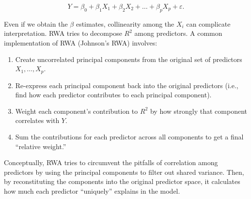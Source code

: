 \begin{equation}
Y = \beta_0 + \beta_1 X_1 + \beta_2 X_2 + \ldots + \beta_p X_p + \varepsilon.
\end{equation}

Even if we obtain the $\beta$ estimates, collinearity among the $X_i$ can complicate interpretation. RWA tries to decompose $R^2$ among predictors. A common implementation of RWA (Johnson's RWA) involves:
\begin{enumerate}
    \item Create uncorrelated principal components from the original set of predictors $X_1, \dots, X_p$.
    \item Re-express each principal component back into the original predictors (i.e., find how each predictor contributes to each principal component).
    \item Weight each component's contribution to $R^2$ by how strongly that component correlates with $Y$.
    \item Sum the contributions for each predictor across all components to get a final ``relative weight.''
\end{enumerate}

Conceptually, RWA tries to circumvent the pitfalls of correlation among predictors by using the principal components to filter out shared variance. Then, by reconstituting the components into the original predictor space, it calculates how much each predictor ``uniquely'' explains in the model. 
